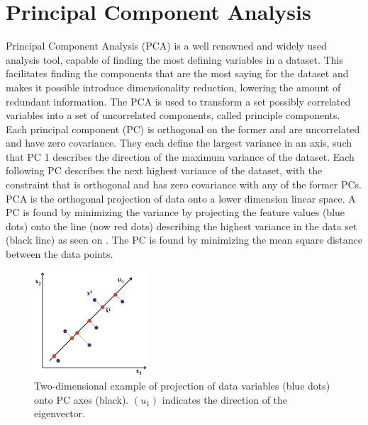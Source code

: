 

\section{Principal Component Analysis}

Principal Component Analysis (PCA) is a well renowned and widely used analysis tool, capable of finding the most defining variables in a dataset. This facilitates finding the components that are the most saying for the dataset and makes it possible introduce dimensionality reduction, lowering the amount of redundant information. The PCA is used to transform a set possibly correlated variables into a set of uncorrelated components, called principle components. Each principal component (PC) is
orthogonal on the former and are uncorrelated and have zero covariance. They each define the largest
variance in an axis, such that PC 1 describes the direction of the maximum variance of the dataset. Each
following PC describes the next highest variance of the dataset, with the constraint that is orthogonal
and has zero covariance with any of the former PCs. PCA is the orthogonal projection of data onto a
lower dimension linear space.  A PC is found by minimizing the variance by projecting the feature values (blue dots) onto the line (now red dots) describing the highest variance in the data set (black line) as seen on . The PC is found by minimizing the mean square distance between the data points. \cite{Semmlow2004}

\begin{figure}[H] 
	\includegraphics[width=0.38\textwidth]{figures/aBackground/projection}
	\caption{Two-dimensional example of projection of data variables (blue dots) onto PC axes (black). $(u_1)$ indicates the direction of the eigenvector. \cite{PCA2018}}
	\label{projection}
\end{figure}

